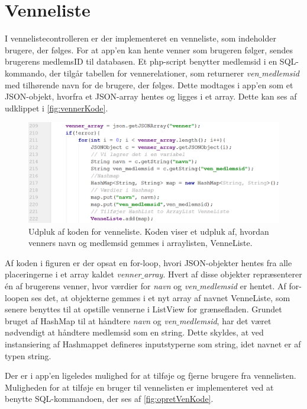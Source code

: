 
\section{Venneliste}
I vennelistecontrolleren er der implementeret en venneliste, som indeholder brugere, der følges. For at app'en kan hente venner som brugeren følger, sendes brugerens medlemsID til databasen. Et php-script benytter medlemsid i en SQL-kommando, der tilgår tabellen for vennerelationer, som returnerer \textit{ven$\_$medlemsid} med tilhørende navn for de brugere, der følges. 
Dette modtages i app'en som et JSON-objekt, hvorfra et JSON-array hentes og ligges i et array. Dette kan ses af udklippet i \autoref{fig:vennerKode}.  

\begin{figure} [H]
\centering
\includegraphics[width=1\textwidth]{figures/imple/vennerKode}
\caption{Udpluk af koden for venneliste. Koden viser et udpluk af, hvordan venners navn og medlemsid gemmes i arraylisten, VenneListe.}
\label{fig:vennerKode}
\end{figure}

\noindent
Af koden i figuren er der opsat en for-loop, hvori JSON-objekter hentes fra alle placeringerne i et array kaldet \textit{venner$\_$array}. Hvert af disse objekter repræsenterer én af brugerens venner, hvor værdier for \textit{navn} og \textit{ven$\_$medlemsid} er hentet. 
Af for-loopen ses det, at objekterne gemmes i et nyt array af navnet VenneListe, som senere benyttes til at opstille vennerne i ListView for grænsefladen. Grundet bruget af HashMap til at håndtere \textit{navn} og \textit{ven$\_$medlemsid}, har det været nødvendigt at håndtere medlemsid som en string. Dette skyldes, at ved instansiering af Hashmappet defineres inputstyperne som string, idet navnet er af typen string. 

Der er i app'en ligeledes mulighed for at tilføje og fjerne brugere fra vennelisten. Muligheden for at tilføje en bruger til vennelisten er implementeret ved at benytte SQL-kommandoen, der ses af \autoref{fig:opretVenKode}.

